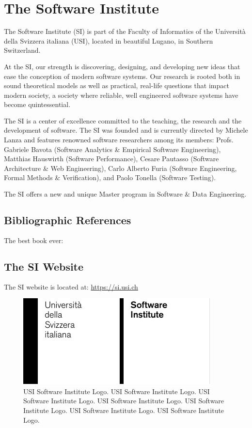 
\section{The Software Institute}

The Software Institute (SI) is part of the Faculty of Informatics of the Universit\`a della Svizzera italiana (USI), located in beautiful Lugano, in Southern Switzerland.

At the SI, our strength is discovering, designing, and developing new ideas that ease the conception of modern software systems. Our research is rooted both in sound theoretical models as well as practical, real-life questions that impact modern society, a society where reliable, well engineered software systems have become quintessential.

The SI is a center of excellence committed to the teaching, the research and the development of software. The SI was founded and is currently directed by Michele Lanza and features renowned software researchers among its members: Profs. Gabriele Bavota (Software Analytics \& Empirical Software Engineering), Matthias Hauswirth (Software Performance), Cesare Pautasso (Software Architecture \& Web Engineering), Carlo Alberto Furia (Software Engineering, Formal Methods \& Verification), and Paolo Tonella (Software Testing).

The SI offers a new and unique Master program in Software \& Data Engineering.

\subsection{Bibliographic References}

The best book ever: \cite{Lanz2006a}

\subsection{The SI Website}

The SI website is located at: \url{https://si.usi.ch}

\begin{figure}[ht]
\centering
\includegraphics[width=0.75\linewidth]{aux/Grid-System-USI-Software.pdf}
\caption{USI Software Institute Logo. USI Software Institute Logo. USI Software Institute Logo. USI Software Institute Logo. USI Software Institute Logo. USI Software Institute Logo. USI Software Institute Logo.}
\end{figure}

